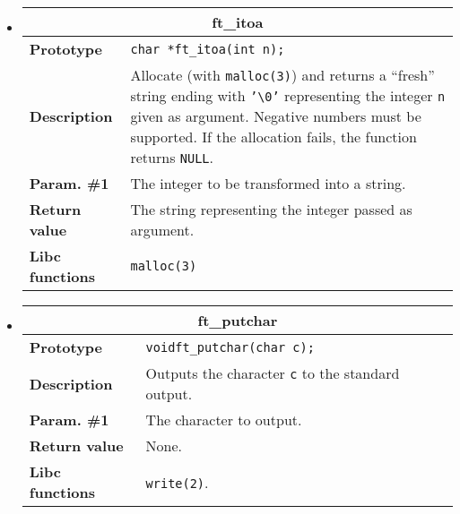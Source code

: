 \documentclass{42-en}
\begin{document}
\begin{itemize}
            \item \begin{tabular}{|l|p{11cm}|}
                \hline
                \multicolumn{2}{|c|}{\textbf{ft\_itoa}}\\
                \hline
                \textbf{Prototype} &
                \texttt{char *\hspace{5mm}ft\_itoa(int n);}\\
                \hline
                \textbf{Description} & Allocate (with
                \texttt{malloc(3)}) and returns a ``fresh'' string ending
                with \texttt{'\textbackslash{}0'} representing the
                integer \texttt{n} given as argument. Negative numbers
                must be supported. If the allocation fails, the function
                returns \texttt{NULL}.\\
                \hline
                \textbf{Param. \#1} & The integer to be transformed
                into a string.\\
                \hline
                \textbf{Return value} & The string representing the integer
                passed as argument.\\
                \hline
                \textbf{Libc functions} & \texttt{malloc(3)}\\
                \hline
            \end{tabular}

            \item \begin{tabular}{|l|p{11cm}|}
                \hline
                \multicolumn{2}{|c|}{\textbf{ft\_putchar}}\\
                \hline
                \textbf{Prototype} &
                \texttt{void\hspace{5mm}ft\_putchar(char c);}\\
                \hline
                \textbf{Description} & Outputs the character \texttt{c}
                to the standard output.\\
                \hline
                \textbf{Param. \#1} & The character to output.\\
                \hline
                \textbf{Return value} & None.\\
                \hline
                \textbf{Libc functions} & \texttt{write(2)}.\\
                \hline
            \end{tabular}


\end{itemize}
\end{document}
